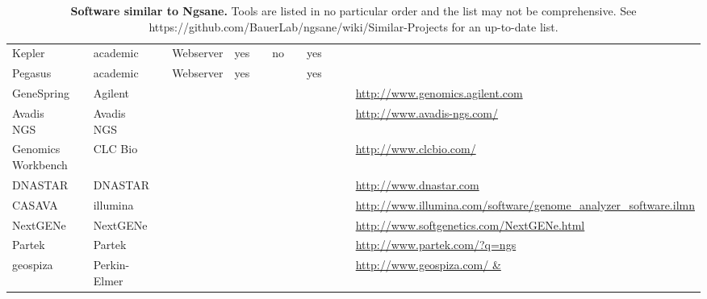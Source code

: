 \documentclass{article}
\newcommand{\prog}{{\sc Ngsane}}
\begin{document}
\begin{landscape}
\begin{table}[htdp]
\begin{center}
\begin{tabular}{|p{2cm}|p{0.6cm}|p{1cm}|p{2cm}|p{1cm}|p{1cm}|p{1cm}|p{1cm}|p{1cm}|p{1cm}|p{1cm}|p{1cm}|p{4cm}|}
Kepler &  & academic &  & Webserver & yes &  & no &  & yes &  &  &  \\
Pegasus &  & academic &  & Webserver & yes &  &  &  & yes &  &  &  \\
GeneSpring &  & Agilent &  &  &  &  &  &  &  &  &  & \url{http://www.genomics.agilent.com} \\
Avadis NGS &  & Avadis NGS &  &  &  &  &  &  &  &  &  & \url{http://www.avadis-ngs.com/} \\
Genomics Workbench &  & CLC Bio &  &  &  &  &  &  &  &  &  & \url{http://www.clcbio.com/} \\
DNASTAR &  & DNASTAR &  &  &  &  &  &  &  &  &  & \url{http://www.dnastar.com} \\
CASAVA &  & illumina &  &  &  &  &  &  &  &  &  & \url{http://www.illumina.com/software/genome\_analyzer\_software.ilmn} \\
NextGENe &  & NextGENe &  &  &  &  &  &  &  &  &  & \url{http://www.softgenetics.com/NextGENe.html} \\
Partek &  & Partek &  &  &  &  &  &  &  &  &  & \url{http://www.partek.com/?q=ngs} \\
geospiza &  & Perkin-Elmer &  &  &  &  &  &  &  &  &  & \url{http://www.geospiza.com/ & } \\
\hline
\end{tabular}
\end{center}
\label{Similartools}
\caption{{\bf Software similar to \prog .} Tools are listed in no particular order and the list may not be comprehensive. See https://github.com/BauerLab/ngsane/wiki/Similar-Projects for an up-to-date list.}
\end{table}%

\end{landscape}



\end{document}
